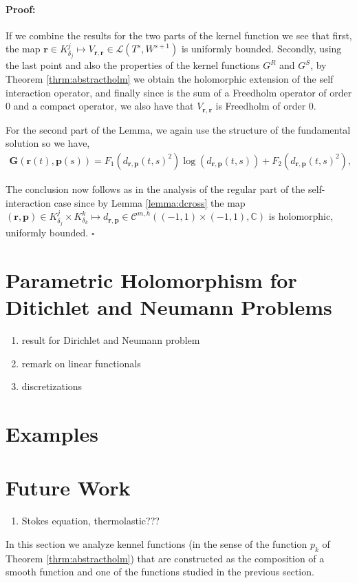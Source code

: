 \documentclass{article}
\newenvironment{proof}{\paragraph{Proof:}}{\hfill$\square$}
\newcommand{\IC}{{\mathbb C}}
\newcommand{\bp}{{\bm p}}
\newcommand{\cmspaceh}[4]{\mathcal{C}^{#1,#2} \left( #3, #4 \right)}
\newcommand{\br}{\bm{r}}
\newcommand{\iinterv}{(-1,1)\times(-1,1)}
\begin{document}
\begin{proof}
If we combine the results for the two parts of the kernel function we see that first, the map $\br \in K^j_{\delta_j} \mapsto V_{\br,\br} \in \mathcal{L}(T^s,W^{s+1})$ is uniformly bounded. Secondly, using the last point and also the properties of the kernel functions $G^R$ and $G^S$, by Theorem \ref{thrm:abstractholm} we obtain the holomorphic extension of the self interaction operator, and  finally since is the sum of a Freedholm operator of order $0$ and a compact operator, we also have that $V_{\br,\br}$ is Freedholm of order $0$. 

For the second part of the Lemma, we again use the structure of the fundamental solution so we have,
\begin{align*}
\mathbf{G}(\br(t),\bp(s)) = F_1(d_{\br,\bp}(t,s)^2) \log(d_{\br,\bp}(t,s)) + F_2(d_{\br,\bp}(t,s)^2),
\end{align*}

 The conclusion now follows as in the analysis of the regular part of the self-interaction case since by Lemma \ref{lemma:dcross} the map $(\br,\bp) \in K^j_{\delta_j} \times K^k_{\delta_k}\mapsto d_{\br,\bp} \in \cmspaceh{m}{h}{\iinterv}{\IC}$ is holomorphic, uniformly bounded. 
\end{proof} 

\section{Parametric Holomorphism for Ditichlet and Neumann Problems}
\begin{enumerate}
\item 
result for Dirichlet and Neumann problem 
\item 
remark on linear functionals
\item 
discretizations
\end{enumerate}

\section{Examples}

\section{Future Work}
\begin{enumerate}
\item 
Stokes equation, thermolastic???
\end{enumerate}

In this section we analyze kennel functions (in the sense of the function $p_k$ of Theorem \ref{thrm:abstractholm}) that are constructed as the composition of a smooth function and one of the functions studied in the previous section. 
\end{document}
